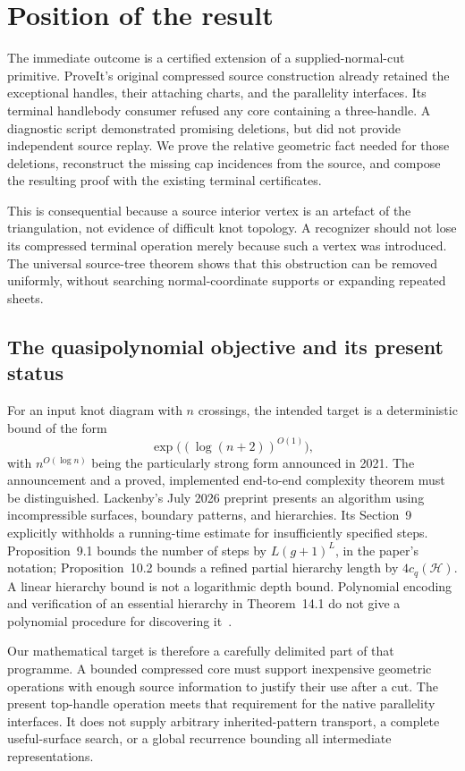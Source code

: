 \section{Position of the result}
\label{sec:position}

The immediate outcome is a certified extension of a supplied-normal-cut
primitive. ProveIt's original compressed source construction already retained
the exceptional handles, their attaching charts, and the parallelity
interfaces. Its terminal handlebody consumer refused any core containing a
three-handle. A diagnostic script demonstrated promising deletions, but did
not provide independent source replay. We prove the relative geometric fact
needed for those deletions, reconstruct the missing cap incidences from the
source, and compose the resulting proof with the existing terminal
certificates.

This is consequential because a source interior vertex is an artefact of the
triangulation, not evidence of difficult knot topology. A recognizer should
not lose its compressed terminal operation merely because such a vertex was
introduced. The universal source-tree theorem shows that this obstruction
can be removed uniformly, without searching normal-coordinate supports or
expanding repeated sheets.

\subsection{The quasipolynomial objective and its present status}

For an input knot diagram with $n$ crossings, the intended target is a
deterministic bound of the form
\[
 \exp\bigl((\log(n+2))^{O(1)}\bigr),
\]
with $n^{O(\log n)}$ being the particularly strong form announced in 2021.
The announcement and a proved, implemented end-to-end complexity theorem
must be distinguished. Lackenby's July 2026 preprint presents an algorithm
using incompressible surfaces, boundary patterns, and hierarchies. Its
Section~9 explicitly withholds a running-time estimate for insufficiently
specified steps. Proposition~9.1 bounds the number of steps by
$L(g+1)^L$, in the paper's notation; Proposition~10.2 bounds a refined
partial hierarchy length by $4c_q(\mathcal H)$. A linear hierarchy bound is
not a logarithmic depth bound. Polynomial encoding and verification of an
essential hierarchy in Theorem~14.1 do not give a polynomial procedure for
discovering it~\cite{lackenby2026,oxford2021}.

Our mathematical target is therefore a carefully delimited part of that
programme. A bounded compressed core must support inexpensive geometric
operations with enough source information to justify their use after a cut.
The present top-handle operation meets that requirement for the native
parallelity interfaces. It does not supply arbitrary inherited-pattern
transport, a complete useful-surface search, or a global recurrence bounding
all intermediate representations.

